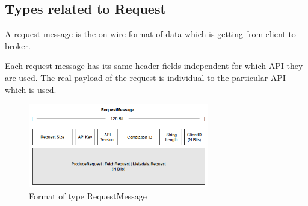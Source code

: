 \subsection{Types related to Request}
A request message is the on-wire format of data which is getting from client to
broker.

Each request message has its same header fields independent for which API they are used. 
The real payload of the request is individual to the particular API which is
used.

\begin{figure}[H]
    \centering
    \includegraphics[width=0.7\textwidth]{images/impl-prot-types-requestMessage.png}
    \caption{Format of type RequestMessage}
    \label{fig:impl-prot-types-requestMessage}
\end{figure}

